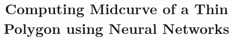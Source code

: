 \documentclass[xcolor=dvipsnames,compress,t,pdf,9pt]{beamer}
\title[\insertframenumber /\inserttotalframenumber]{Computing Midcurve of a Thin Polygon using Neural Networks}
\begin{document}
	\begin{frame}
	\titlepage
	\end{frame}
	
	

	
\end{document}
